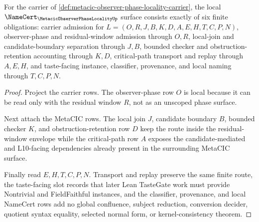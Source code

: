 \begin{theorem}
\label{thm:metacic-observer-phase-locality-namecert-obligations}
For the carrier of \autoref{def:metacic-observer-phase-locality-carrier}, the local $\NameCert_{\MetacicObserverPhaseLocalityUp}$ surface consists exactly of six finite obligations: carrier admission for $L=(O,R,J,B,K,D,A,E,H,T,C,P,N)$, observer-phase and residual-window admission through $O,R$, local-join and candidate-boundary separation through $J,B$, bounded checker and obstruction-retention accounting through $K,D$, critical-path transport and replay through $A,E,H$, and taste-facing instance, classifier, provenance, and local naming through $T,C,P,N$.
\end{theorem}
\begin{proof}
Project the carrier rows. The observer-phase row $O$ is local because it can be read only with the residual window $R$, not as an unscoped phase surface.

Next attach the MetaCIC rows. The local join $J$, candidate boundary $B$, bounded checker $K$, and obstruction-retention row $D$ keep the route inside the residual-window envelope while the critical-path row $A$ exposes the candidate-mediated and L10-facing dependencies already present in the surrounding MetaCIC surface.

Finally read $E,H,T,C,P,N$. Transport and replay preserve the same finite route, the taste-facing slot records that later Lean TasteGate work must provide Nontrivial and FieldFaithful instances, and the classifier, provenance, and local NameCert rows add no global confluence, subject reduction, conversion decider, quotient syntax equality, selected normal form, or kernel-consistency theorem.
\end{proof}



